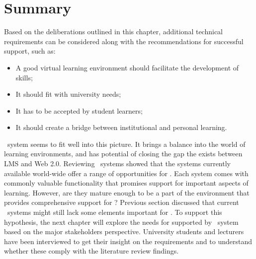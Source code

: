 \section{Summary}

Based on the deliberations outlined in this chapter, additional technical
requirements can be considered along with the recommendations for successful
\LLLs support, such as:

\begin{itemize}
	\item A good virtual learning environment should facilitate the development of
	\LLLs skills;
	\item It should fit with university needs;
	\item It has to be accepted by student learners;
	\item It should create a bridge between institutional and personal learning.
\end{itemize}

\ep~system seems to fit well into this picture. It brings a balance into the
world of learning environments, and has potential of closing the gap the exists
between LMS and Web 2.0. Reviewing \ep~systems showed that the systems currently
available world-wide offer a range of opportunities for \LLLsn. Each system
comes with commonly valuable functionality that promises support for important
aspects of learning. However, are they mature enough to be a part of the
environment that provides comprehensive support for \LLLsn? Previous section
discussed that current \ep~systems might still lack some elements important for
\LLLsn. To support this hypothesis, the next chapter will explore the needs for
\LLLs supported by \ep~system based on the major stakeholders perspective.
University students and lecturers have been interviewed to get their insight on
the requirements and to understand whether these comply with the literature
review findings.
